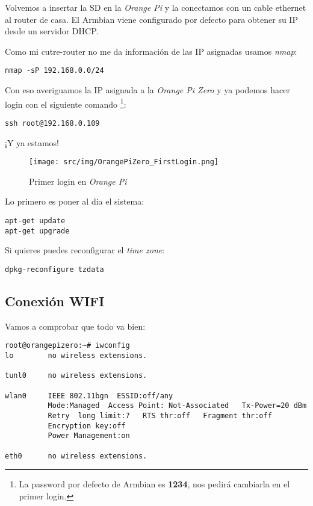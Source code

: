 \documentclass[12pt,spanish,]{scrartcl}
\begin{document}
Volvemos a insertar la SD en la \emph{Orange Pi} y la conectamos con un
cable ethernet al router de casa. El Armbian viene configurado por
defecto para obtener su IP desde un servidor DHCP.

Como mi cutre-router no me da información de las IP asignadas usamos
\emph{nmap}:

\begin{verbatim}
nmap -sP 192.168.0.0/24
\end{verbatim}

Con eso averiguamos la IP asignada a la \emph{Orange Pi Zero} y ya
podemos hacer login con el siguiente comando \footnote{La password por
  defecto de Armbian es \textbf{1234}, nos pedirá cambiarla en el primer
  login.}:

\begin{verbatim}
ssh root@192.168.0.109
\end{verbatim}

¡Y ya estamos!

\begin{figure}
\centering
\texttt{[image: src/img/OrangePiZero\_FirstLogin.png]}
\caption{Primer login en \emph{Orange Pi}}
\end{figure}

Lo primero es poner al dia el sistema:

\begin{verbatim}
apt-get update
apt-get upgrade
\end{verbatim}

Si quieres puedes reconfigurar el \emph{time zone}:

\begin{verbatim}
dpkg-reconfigure tzdata
\end{verbatim}

\hypertarget{conexiuxf3n-wifi}{%
\subsection{Conexión WIFI}\label{conexiuxf3n-wifi}}

Vamos a comprobar que todo va bien:

\begin{verbatim}
root@orangepizero:~# iwconfig
lo        no wireless extensions.

tunl0     no wireless extensions.

wlan0     IEEE 802.11bgn  ESSID:off/any
          Mode:Managed  Access Point: Not-Associated   Tx-Power=20 dBm
          Retry  long limit:7   RTS thr:off   Fragment thr:off
          Encryption key:off
          Power Management:on

eth0      no wireless extensions.
\end{verbatim}
\end{document}
